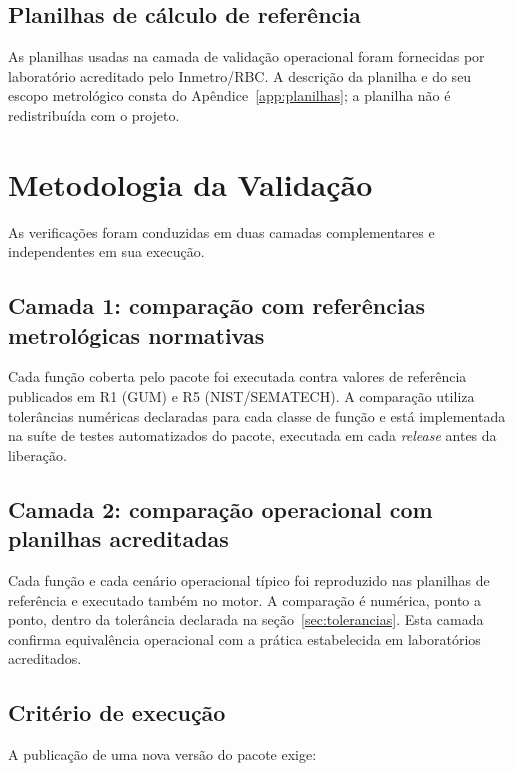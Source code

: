 \documentclass[11pt,a4paper]{article}
\begin{document}
\subsection{Planilhas de cálculo de referência}

As planilhas usadas na camada de validação operacional foram fornecidas por laboratório acreditado pelo Inmetro/RBC. A descrição da planilha e do seu escopo metrológico consta do Apêndice~\ref{app:planilhas}; a planilha não é redistribuída com o projeto.

\section{Metodologia da Validação}
\label{sec:metodologia}

As verificações foram conduzidas em duas camadas complementares e independentes em sua execução.

\subsection{Camada 1: comparação com referências metrológicas normativas}

Cada função coberta pelo pacote foi executada contra valores de referência publicados em R1 (GUM) e R5 (NIST/SEMATECH). A comparação utiliza tolerâncias numéricas declaradas para cada classe de função e está implementada na suíte de testes automatizados do pacote, executada em cada \emph{release} antes da liberação.

\subsection{Camada 2: comparação operacional com planilhas acreditadas}

Cada função e cada cenário operacional típico foi reproduzido nas planilhas de referência e executado também no motor. A comparação é numérica, ponto a ponto, dentro da tolerância declarada na seção~\ref{sec:tolerancias}. Esta camada confirma equivalência operacional com a prática estabelecida em laboratórios acreditados.

\subsection{Critério de execução}

A publicação de uma nova versão do pacote exige:
\end{document}
